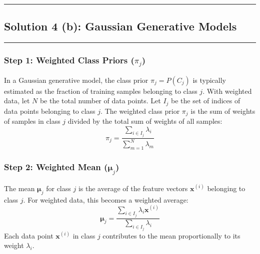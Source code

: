 \documentclass{article}
\begin{document}
\noindent\rule{\textwidth}{0.4pt}

\newpage

\subsection*{Solution 4 (b): Gaussian Generative Models}
\noindent\rule{\textwidth}{0.4pt}

\subsubsection*{Step 1: Weighted Class Priors ($\pi_j$)}
\parbox{\textwidth}{
In a Gaussian generative model, the class prior $\pi_j = P(C_j)$ is typically estimated as the fraction of training samples belonging to class $j$. With weighted data, let $N$ be the total number of data points. Let $I_j$ be the set of indices of data points belonging to class $j$. The weighted class prior $\pi_j$ is the sum of weights of samples in class $j$ divided by the total sum of weights of all samples:
$$ \pi_j = \frac{\sum_{i \in I_j} \lambda_i}{\sum_{m=1}^{N} \lambda_m} $$
}

\subsubsection*{Step 2: Weighted Mean ($\boldsymbol{\mu}_j$)}
\parbox{\textwidth}{
The mean $\boldsymbol{\mu}_j$ for class $j$ is the average of the feature vectors $\mathbf{x}^{(i)}$ belonging to class $j$. For weighted data, this becomes a weighted average:
$$ \boldsymbol{\mu}_j = \frac{\sum_{i \in I_j} \lambda_i \mathbf{x}^{(i)}}{\sum_{i \in I_j} \lambda_i} $$
Each data point $\mathbf{x}^{(i)}$ in class $j$ contributes to the mean proportionally to its weight $\lambda_i$.
}
\end{document}

